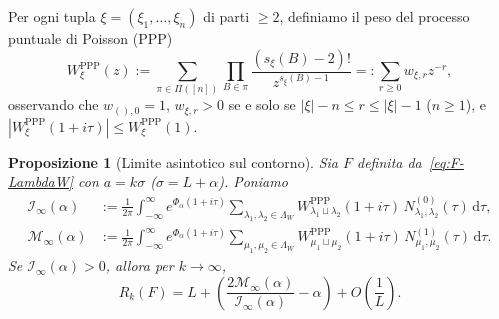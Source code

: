 \documentclass[11pt, reqno]{amsart}
\newtheorem{proposition}[lemma]{Proposizione}
\theoremstyle{remark}
\numberwithin{equation}{section}
\newcommand{\dd}{\,\mathrm{d}}
\begin{document}
Per ogni tupla $\xi = (\xi_1,\dots,\xi_n)$ di parti $\ge 2$, definiamo il peso del processo puntuale
di Poisson (PPP)
\begin{equation}\label{eq:WPPP-def}
W_\xi^{\mathrm{PPP}}(z) := \sum_{\pi \in \Pi([n])} \prod_{B \in \pi}
\frac{(s_\xi(B)-2)!}{z^{s_\xi(B)-1}} =: \sum_{r \ge 0} w_{\xi, r} z^{-r},
\end{equation}
osservando che $w_{(),0} = 1$, $w_{\xi, r} > 0$ se e solo se $|\xi| - n \le r \le |\xi| - 1$ ($n \ge 1$), e
$|W_\xi^{\mathrm{PPP}}(1+i\tau)| \le W_\xi^{\mathrm{PPP}}(1)$.

\begin{proposition}[Limite asintotico sul contorno]\label{prop:contour-limit}
Sia $F$ definita da~\eqref{eq:F-LambdaW} con $a = k\sigma$ ($\sigma = L+\alpha$). Poniamo
\begin{align}
\mathcal{I}_\infty(\alpha) &:= \frac{1}{2\pi}\int_{-\infty}^\infty e^{\Phi_\alpha(1+i\tau)}
\sum_{\lambda_1,\lambda_2 \in \Lambda_W} W_{\lambda_1\sqcup\lambda_2}^{\mathrm{PPP}}(1+i\tau)\, N_{\lambda_1,\lambda_2}^{(0)}(\tau)\dd\tau, \label{eq:I-inf-def}\\
\mathcal{M}_\infty(\alpha) &:= \frac{1}{2\pi}\int_{-\infty}^\infty e^{\Phi_\alpha(1+i\tau)}
\sum_{\mu_1,\mu_2 \in \Lambda_W} W_{\mu_1\sqcup\mu_2}^{\mathrm{PPP}}(1+i\tau)\, N_{\mu_1,\mu_2}^{(1)}(\tau)\dd\tau. \label{eq:M-inf-def}
\end{align}
Se $\mathcal{I}_\infty(\alpha) > 0$, allora per $k \to \infty$,
\begin{equation}\label{eq:quotient-limit}
R_k(F) = L + \left(\frac{2\mathcal{M}_\infty(\alpha)}{\mathcal{I}_\infty(\alpha)} - \alpha\right) + O\!\left(\frac{1}{L}\right).
\end{equation}
\end{proposition}
\end{document}
